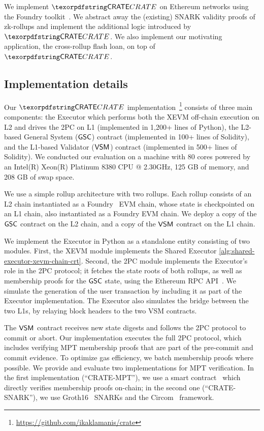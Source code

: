We implement $\pname$ on Ethereum networks using the Foundry toolkit~\cite{foundry-book}. We abstract away the (existing) SNARK validity proofs of zk-rollups and implement the additional logic introduced by $\pname$. We also implement our motivating application, the cross-rollup flash loan, on top of $\pname$. %

\subsection{Implementation details}

Our $\pname$ implementation~\footnote{\url{https://github.com/ikaklamanis/crate}} consists of three main components: the Executor which performs both the XEVM off-chain execution on L2 and drives the 2PC on L1 (implemented in 1,200+ lines of Python), the L2-based General System ($\mathsf{GSC}$) contract (implemented in 100+ lines of Solidity), and the L1-based Validator ($\mathsf{VSM}_{}$) contract (implemented in 500+ lines of Solidity). We conducted our evaluation on a machine with 80 cores powered by an Intel(R) Xeon(R) Platinum 8380 CPU @ 2.30GHz, 125 GB of memory, and 208 GB of swap space.

We use a simple rollup architecture with two rollups. Each rollup consists of an L2 chain instantiated as a Foundry~\cite{foundry-book} EVM chain, whose state is checkpointed on an L1 chain, also instantiated as a Foundry EVM chain. We deploy a copy of the $\mathsf{GSC}$ contract on the L2 chain, and a copy of the $\mathsf{VSM}_{}$ contract on the L1 chain. 

We implement the Executor in Python as a standalone entity consisting of two modules. First, the XEVM module implements the Shared Executor \cref{alg:shared-executor-xevm-chain-crt}. 
Second, the 2PC module implements the Executor's role in the 2PC protocol; it fetches the state roots of both rollups, as well as membership proofs for the $\mathsf{GSC}$ state, using the Ethereum RPC API~\cite{eth-rpc-api}. 
We simulate the generation of the user transaction by including it as part of the Executor implementation. The Executor also simulates the bridge between the two L1s, by relaying block headers to the two VSM contracts. 

The $\mathsf{VSM}_{}$ contract receives new state digests and follows the 2PC protocol to commit or abort. Our implementation executes the full 2PC protocol, which includes verifying MPT membership proofs that are part of the pre-commit and commit evidence. To optimize gas efficiency, we batch membership proofs where possible. We provide and evaluate two implementations for MPT verification. In the first implementation (``CRATE-MPT''), we use a smart contract~\cite{solidity-mpt} which directly verifies membership proofs on-chain; in the second one (``CRATE-SNARK''), we use Groth16~\cite{groth-16} SNARKs  and the Circom~\cite{circom-site} framework. %

